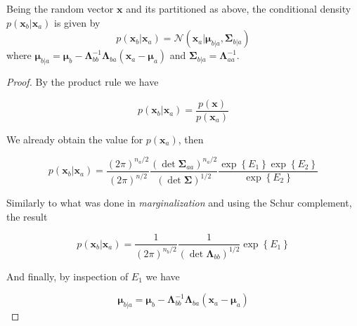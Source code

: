 \begin{appendices}
  \begin{theorem}[Conditioning]
    Being the random vector $\mathbf{x}$ and its partitioned as above, the conditional density $p(\mathbf{x}_b | \mathbf{x}_a)$ is given by
    \begin{displaymath}
      p(\mathbf{x}_b | \mathbf{x}_a) = \mathcal{N}\left( \mathbf{x}_a | \boldsymbol{\mu}_{b|a}, \boldsymbol{\Sigma}_{b|a} \right)
    \end{displaymath}
    where $\boldsymbol{\mu}_{b|a} = \boldsymbol{\mu}_{b}-\boldsymbol{\Lambda}_{b b}^{-1} \boldsymbol{\Lambda}_{b a}\left(\mathbf{x}_{a}-\boldsymbol{\mu}_{a}\right)$ and $\boldsymbol{\Sigma}_{b|a} = \boldsymbol{\Lambda}_{aa}^{-1}$.
  \end{theorem}

  \begin{proof}
    By the product rule we have

    \begin{equation}
      p(\mathbf{x}_b|\mathbf{x}_a)=\frac{p(\mathbf{x})}{p(\mathbf{x}_a)}
    \end{equation}

    We already obtain the value for $p(\mathbf{x}_a)$, then

    \begin{equation}
      p(\mathbf{x}_b|\mathbf{x}_a)=\frac{(2 \pi )^{n_a/2}}{\left( 2 \pi \right)^{n/2}} \frac{( \det \mathbf{\Sigma}_{aa} )^{n_a/2}}{\left( \det \boldsymbol{\Sigma} \right)^{1/2}} \frac{\exp \left\{ E_1 \right\} \exp \left\{ E_2 \right\}}{\exp \left\{ E_2 \right\}}
    \end{equation}
    
    Similarly to what was done in \textit{marginalization} and using the Schur complement, the result

    \begin{equation}
      p(\mathbf{x}_b|\mathbf{x}_a)=\frac{1}{\left( 2 \pi \right)^{n_b/2}} \frac{1}{\left( \det \boldsymbol{\Lambda}_{bb} \right)^{1/2}} \exp \left\{ E_1 \right\}
    \end{equation}

    And finally, by inspection of $E_1$ we have

    \begin{equation}
      \boldsymbol{\mu}_{b|a} =  \boldsymbol{\mu}_{b}-\boldsymbol{\Lambda}_{b b}^{-1} \boldsymbol{\Lambda}_{b a}\left(\mathbf{x}_{a}-\boldsymbol{\mu}_{a}\right)
    \end{equation}
  \end{proof}


\end{appendices}
